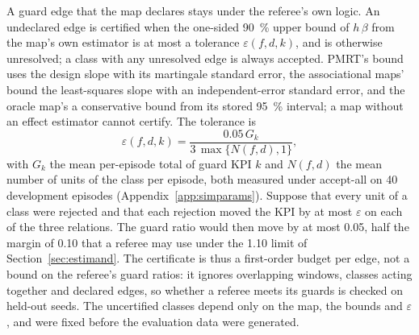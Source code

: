 A guard edge that the map declares stays under the referee's own logic. An undeclared edge is certified when the
one-sided 90~\% upper bound of $h\,\beta$ from the map's own estimator is at most a tolerance $\varepsilon(f, d, k)$,
and is otherwise unresolved; a class with any unresolved edge is always accepted. PMRT's bound uses the design slope
with its martingale standard error, the associational maps' bound the least-squares slope with an independent-error
standard error, and the oracle map's a conservative bound from its stored 95~\% interval; a map without an effect
estimator cannot certify. The tolerance is
\begin{equation}
\varepsilon(f, d, k) = \frac{0.05\, G_k}{3\, \max\{N(f, d), 1\}},
\label{eq:tol}
\end{equation}
with $G_k$ the mean per-episode total of guard KPI $k$ and $N(f, d)$ the mean number of units of the class per
episode, both measured under accept-all on 40 development episodes (Appendix~\ref{app:simparams}). Suppose that every unit of a
class were rejected and that each rejection moved the KPI by at most $\varepsilon$ on each of the three relations. The
guard ratio would then move by at most 0.05, half the margin of 0.10 that a referee may use under the 1.10 limit of
Section~\ref{sec:estimand}. The certificate is thus a first-order budget per edge, not a bound on the referee's guard
ratios: it ignores overlapping windows, classes acting together and declared edges, so whether a referee meets its
guards is checked on held-out seeds. The uncertified classes depend only on the map, the bounds and $\varepsilon$, and
were fixed before the evaluation data were generated.

